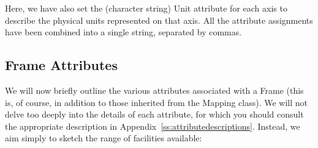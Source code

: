 \documentclass[twoside,11pt]{article}
\newcommand{\appref}[1]{Appendix~\ref{#1}}
\newcommand{\appref}[1]{\ref{#1}}
\begin{document}
Here, we have also set the (character string) Unit attribute for each
axis to describe the physical units represented on that axis. All the
attribute assignments have been combined into a single string,
separated by commas.

\subsection{\label{ss:frameattributes}Frame Attributes}

We will now briefly outline the various attributes associated with a
Frame (this is, of course, in addition to those inherited from the
Mapping class). We will not delve too deeply into the details of each
attribute, for which you should consult the appropriate description in
\appref{ss:attributedescriptions}. Instead, we aim simply to sketch
the range of facilities available:
\end{document}
